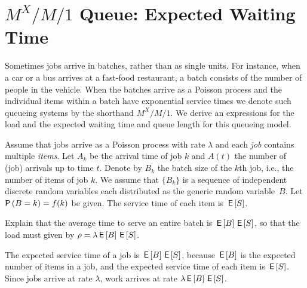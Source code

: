 \section
{$M^X/M/1$ Queue: Expected Waiting Time}
\label{sec:mxm1-queue:-expected}



Sometimes jobs arrive in batches, rather than as single units.
For instance, when a car or a bus arrives at a fast-food restaurant, a batch consists of the number of people in the vehicle.
When the batches arrive as a Poisson process and the individual items within a batch have exponential service times we denote such queueing systems by the shorthand $M^X/M/1$.
We derive an expressions for the load and the expected waiting time and queue length for this queueing model. 

Assume that jobs arrive as a Poisson process with rate $\lambda$ and each \emph{job} contains multiple \emph{items}. Let $A_k$ be the arrival time of job $k$ and $A(t)$ the number of (job) arrivals up to time $t$. Denote by $B_k$ the batch size of the $k$th job, i.e., the number of items of job $k$. We assume that $\{B_k\}$ is a sequence of independent discrete random variables each distributed as the generic random variable~$B$. Let $\P{B = k} = f(k)$ be given. %
The service time of each item is $\,\mathsf{E}\left[S\right]$.

\begin{exercise}
  Explain that the average time to serve an entire batch is $\,\mathsf{E}\left[B\right] \,\mathsf{E}\left[S\right]$, so that the load must given by $\rho = \lambda \,\mathsf{E}\left[B\right] \,\mathsf{E}\left[S\right]$.
\begin{solution}
  The expected service time of a job is $\,\mathsf{E}\left[B\right] \,\mathsf{E}\left[S\right]$, because $\,\mathsf{E}\left[B\right]$ is the expected number of items in a job, and the expected service time of each item is $\,\mathsf{E}\left[S\right]$.  Since jobs arrive at rate $\lambda$, work arrives at rate $\lambda \,\mathsf{E}\left[B\right] \,\mathsf{E}\left[S\right]$. 
\end{solution}
\end{exercise}



